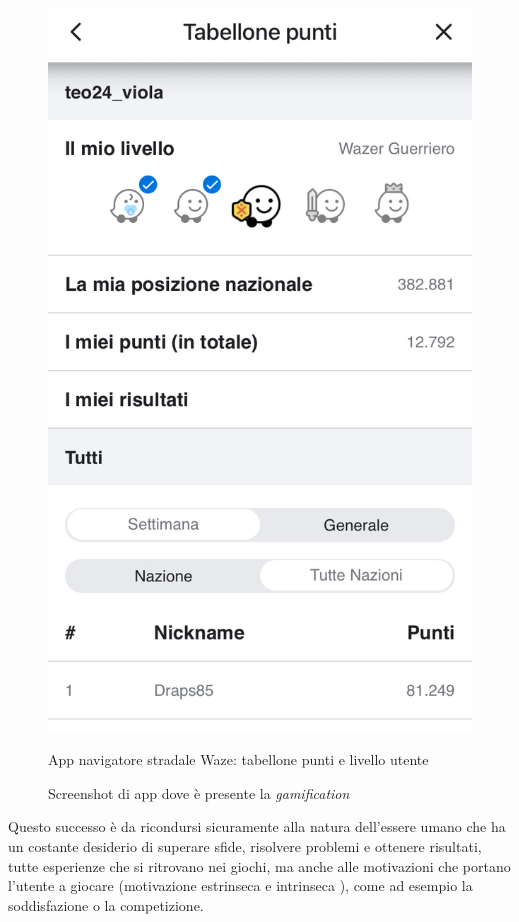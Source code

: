 \begin{figure}
\begin{minipage}[h]{0.4\linewidth}
        \includegraphics[width=1\textwidth]{img/waze2.jpeg}
        \caption{App navigatore stradale Waze: tabellone punti e livello utente}
        \label{fig:waze-level}
    \end{minipage}
    \caption{Screenshot di app dove è presente la \textit{gamification} \cite{wazeApp}} 
    \label{fig:gamification-example}
\end{figure}

Questo successo è da ricondursi sicuramente alla natura dell'essere umano che ha un costante desiderio di superare sfide, risolvere problemi e ottenere risultati, tutte esperienze che si ritrovano nei giochi, ma anche alle motivazioni che portano l'utente a giocare (motivazione estrinseca e intrinseca \cite{Deci1975IntrinsicMA}), come ad esempio la soddisfazione o la competizione.

